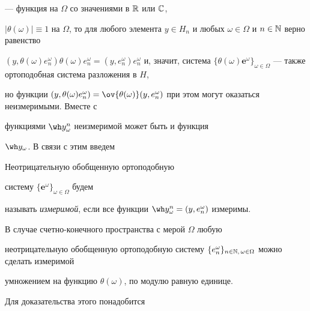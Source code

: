 --- функция на $\Omega$ со значениями в $\Bbb R$ или $\Bbb C$,


$|\theta(\omega)|\equiv 1$ на $\Omega$, то для любого элемента $y\in


H_n$ и любых $\omega\in\Omega$ и $n\in\Bbb N$ верно равенство


$(y,\theta(\omega)e^\omega_n)\theta(\omega)e^\omega_n=(y,e^\omega_n


)e^\omega_n$ и, значит, система $\{\theta(\omega)\boldsymbol e^\omega


\}_{\omega\in\Omega}$ --- также ортоподобная система разложения в $H$,


но функции $(y,\theta(\omega)e^\omega_n)=\ov{\theta(\omega)}


(y,e^\omega_n)$ при этом могут оказаться неизмеримыми. Вместе с


функциями $\wh y_\omega^n$ неизмеримой может быть и функция


$\wh y_\omega$. В связи с этим введем





\begin{defn}\hspace{-1.8mm}{\bf.}


Неотрицательную обобщенную ортоподобную


систему $\{\boldsymbol e^\omega\}_{\omega\in\Omega}$ будем


называть {\it измеримой}, если все функции $\wh y^n_\omega


=(y,e^\omega_n)$ измеримы.


\end{defn}





В случае счетно-конечного пространства с мерой $\Omega$ любую


неотрицательную обобщенную ортоподобную систему $\{e^\omega_n


\}_{n\in\Bbb N,\,\omega\in\Omega}$ можно сделать измеримой


умножением на функцию $\theta(\omega)$, по модулю равную единице.


Для доказательства этого понадобится





